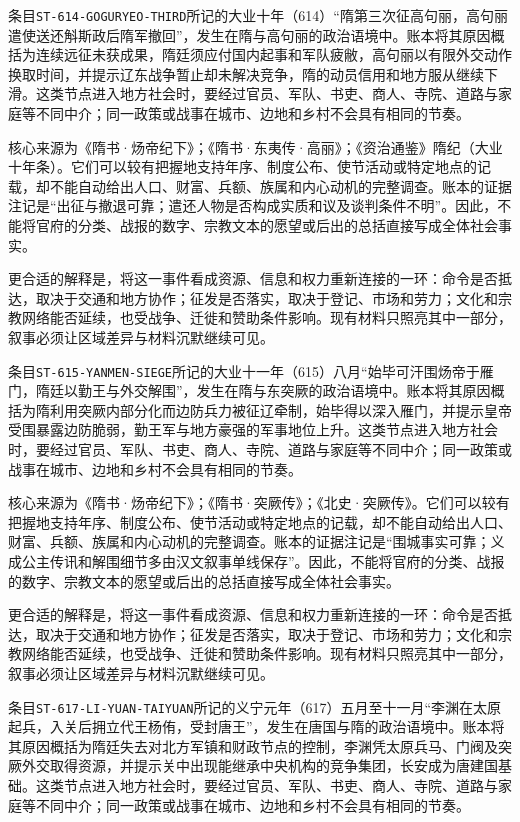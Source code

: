 
条目\texttt{ST-614-GOGURYEO-THIRD}所记的大业十年（614）“隋第三次征高句丽，高句丽遣使送还斛斯政后隋军撤回”，发生在隋与高句丽的政治语境中。账本将其原因概括为连续远征未获成果，隋廷须应付国内起事和军队疲敝，高句丽以有限外交动作换取时间，并提示辽东战争暂止却未解决竞争，隋的动员信用和地方服从继续下滑。这类节点进入地方社会时，要经过官员、军队、书吏、商人、寺院、道路与家庭等不同中介；同一政策或战事在城市、边地和乡村不会具有相同的节奏。

核心来源为《隋书·炀帝纪下》；《隋书·东夷传·高丽》；《资治通鉴》隋纪（大业十年条）。它们可以较有把握地支持年序、制度公布、使节活动或特定地点的记载，却不能自动给出人口、财富、兵额、族属和内心动机的完整调查。账本的证据注记是“出征与撤退可靠；遣还人物是否构成实质和议及谈判条件不明”。因此，不能将官府的分类、战报的数字、宗教文本的愿望或后出的总括直接写成全体社会事实。

更合适的解释是，将这一事件看成资源、信息和权力重新连接的一环：命令是否抵达，取决于交通和地方协作；征发是否落实，取决于登记、市场和劳力；文化和宗教网络能否延续，也受战争、迁徙和赞助条件影响。现有材料只照亮其中一部分，叙事必须让区域差异与材料沉默继续可见。


条目\texttt{ST-615-YANMEN-SIEGE}所记的大业十一年（615）八月“始毕可汗围炀帝于雁门，隋廷以勤王与外交解围”，发生在隋与东突厥的政治语境中。账本将其原因概括为隋利用突厥内部分化而边防兵力被征辽牵制，始毕得以深入雁门，并提示皇帝受围暴露边防脆弱，勤王军与地方豪强的军事地位上升。这类节点进入地方社会时，要经过官员、军队、书吏、商人、寺院、道路与家庭等不同中介；同一政策或战事在城市、边地和乡村不会具有相同的节奏。

核心来源为《隋书·炀帝纪下》；《隋书·突厥传》；《北史·突厥传》。它们可以较有把握地支持年序、制度公布、使节活动或特定地点的记载，却不能自动给出人口、财富、兵额、族属和内心动机的完整调查。账本的证据注记是“围城事实可靠；义成公主传讯和解围细节多由汉文叙事单线保存”。因此，不能将官府的分类、战报的数字、宗教文本的愿望或后出的总括直接写成全体社会事实。

更合适的解释是，将这一事件看成资源、信息和权力重新连接的一环：命令是否抵达，取决于交通和地方协作；征发是否落实，取决于登记、市场和劳力；文化和宗教网络能否延续，也受战争、迁徙和赞助条件影响。现有材料只照亮其中一部分，叙事必须让区域差异与材料沉默继续可见。


条目\texttt{ST-617-LI-YUAN-TAIYUAN}所记的义宁元年（617）五月至十一月“李渊在太原起兵，入关后拥立代王杨侑，受封唐王”，发生在唐国与隋的政治语境中。账本将其原因概括为隋廷失去对北方军镇和财政节点的控制，李渊凭太原兵马、门阀及突厥外交取得资源，并提示关中出现能继承中央机构的竞争集团，长安成为唐建国基础。这类节点进入地方社会时，要经过官员、军队、书吏、商人、寺院、道路与家庭等不同中介；同一政策或战事在城市、边地和乡村不会具有相同的节奏。

